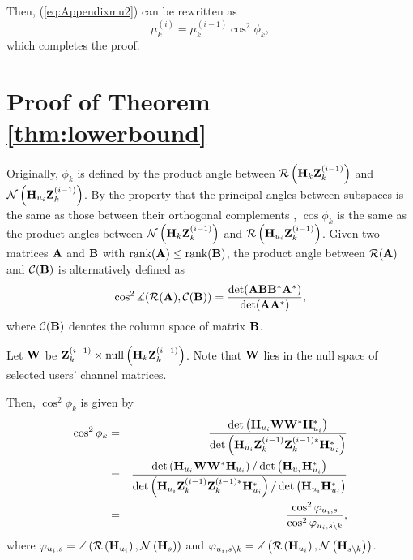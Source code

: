 \documentclass[journal,twoside]{IEEEtranTCOM}
\begin{document}
Then, (\ref{eq:Appendixmu2}) can be rewritten as
\begin{equation} \label{eq:Appendixmu3}
\mu _k^{(i)} = \mu _k^{(i-1)}{\cos^2 \phi_k},
\end{equation}
which completes the proof.

\section{Proof of Theorem \ref{thm:lowerbound}} \label{Appendix:thm2}
Originally, $\phi_k$ is defined by the product angle between ${\cal{R}}\left({{\bf{H}}_k}{\bf{Z}}_k^{(i-1)}\right)$ and ${\cal{N}}\left({{\bf{H}}_{u_{i}}}{\bf{Z}}_k^{(i-1)}\right)$. By the property that the principal angles between subspaces is the same as those between their orthogonal complements \cite{AngleOrthogonal, AngleOrthogonal2}, $\cos \phi_k$ is the same as the product angles between  ${\cal{N}}\left({{\bf{H}}_k}{\bf{Z}}_k^{(i-1)}\right)$ and ${\cal{R}}\left({{\bf{H}}_{u_{i}}}{\bf{Z}}_k^{(i-1)}\right)$. Given two matrices ${\bf{A}}$ and ${\bf{B}}$ with $\textrm{rank}({\bf{A}}) \leq \textrm{rank}({\bf{B}})$, the product angle between ${\cal{R}}(\bf{A})$ and ${\cal{C}}(\bf{B})$ is alternatively defined as \cite{ProductAngle2}
\begin{equation}
\cos ^2 \measuredangle (\cal{R}({\bf{A}}),\cal{C}({\bf{B}}) )=\frac{\det({\bf{A}}{\bf{B}}{\bf{B}}^*{\bf{A}}^*)} {\det({\bf{A}}{\bf{A}}^*)},
\end{equation}
where ${\cal{C}}(\bf{B})$ denotes the column space of matrix $\bf{B}$.

Let $\bf{W}$ be ${\bf{Z}}_k^{(i-1)} \times \mathrm{null}\left({{\bf{H}}_k}{\bf{Z}}_k^{(i-1)}\right)$. Note that $\bf{W}$ lies in the null space of selected users' channel matrices.

Then, $\cos^2 \phi_k$ is given by
\begin{eqnarray}
\cos^2 \phi_k & = & \frac {\det \left( {\bf{H}}_{u_{i}} {\bf{W}} {\bf{W}}^* {\bf{H}}^*_{u_{i}}\right)} {\det\left({{\bf{H}}_{u_{i}}}{\bf{Z}}_k^{(i-1)} {\bf{Z}}_k^{(i-1)*}{\bf{H}}_{u_{i}}^*\right)} \nonumber \\
& = & \frac {\det \left( {\bf{H}}_{u_{i}} {\bf{W}} {\bf{W}}^* {\bf{H}}_{u_{i}}\right) / \det \left( {\bf{H}}_{u_{i}} {\bf{H}}^*_{u_{i}}\right) }
 {\det\left({{\bf{H}}_{u_{i}}}{\bf{Z}}_k^{(i-1)} {\bf{Z}}_k^{(i-1)*}{\bf{H}}_{u_{i}}^*\right) / \det \left( {\bf{H}}_{u_{i}} {\bf{H}}^*_{u_{i}}\right)} \nonumber \\
& = & \frac{\cos^2 \varphi_{{u_i}, s}} {\cos^2 \varphi_{{u_i}, s \setminus k }},
\end{eqnarray}
where $\varphi_{{u_i}, s} = \measuredangle \left({\cal{R}}\left({{\bf{H}}_{u_i}}\right), {\cal{N}}\left({{\bf{H}}_{s}} \right)\right)$ and $\varphi_{{u_i}, s \setminus k } = \measuredangle \left({\cal{R}}\left({{\bf{H}}_{u_i}}\right), {\cal{N}}\left({{\bf{H}}_{s \setminus k}} \right)\right)$.
\end{document}
